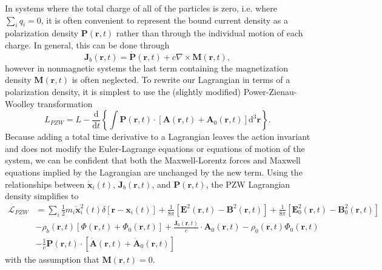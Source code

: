 In systems where the total charge of all of the particles is zero, i.e. where $\sum_iq_i = 0$, it is often convenient to represent the bound current density as a polarization density $\mathbf{P}(\mathbf{r},t)$ rather than through the individual motion of each charge. In general, this can be done through
\begin{equation}
\mathbf{J}_b(\mathbf{r},t) = \dot{\mathbf{P}}(\mathbf{r},t) + c\nabla\times\mathbf{M}(\mathbf{r},t),
\end{equation}
however in nonmagnetic systems the last term containing the magnetization density $\mathbf{M}(\mathbf{r},t)$ is often neglected. To rewrite our Lagrangian in terms of a polarization density, it is simplest to use the (slightly modified) Power-Zienau-Woolley transformation
\begin{equation}
L_{PZW} = L - \frac{\mathrm{d}}{\mathrm{d}t}\left\{\int\mathbf{P}(\mathbf{r},t)\cdot\left[\mathbf{A}(\mathbf{r},t) + \mathbf{A}_0(\mathbf{r},t)\right]\mathrm{d}^3\mathbf{r}\right\}.
\end{equation}
Because adding a total time derivative to a Lagrangian leaves the action invariant and does not modify the Euler-Lagrange equations or equations of motion of the system, we can be confident that both the Maxwell-Lorentz forces and Maxwell equations implied by the Lagrangian are unchanged by the new term. Using the relationships between $\dot{\mathbf{x}}_i(t)$, $\mathbf{J}_b(\mathbf{r},t)$, and $\mathbf{P}(\mathbf{r},t)$, the PZW Lagrangian density simplifies to
\begin{equation}
\begin{split}
\mathcal{L}_{PZW} &= \sum_i\frac{1}{2}m_i\dot{\mathbf{x}}_i^2(t)\delta[\mathbf{r} - \mathbf{x}_i(t)] + \frac{1}{8\pi}\left[\mathbf{E}^2(\mathbf{r},t) - \mathbf{B}^2(\mathbf{r},t)\right] + \frac{1}{8\pi}\left[\mathbf{E}_0^2(\mathbf{r},t) - \mathbf{B}_0^2(\mathbf{r},t)\right]\\
& - \rho_b(\mathbf{r},t)\left[\Phi(\mathbf{r},t) + \Phi_0(\mathbf{r},t)\right] + \frac{\mathbf{J}_0(\mathbf{r},t)}{c}\cdot\mathbf{A}_0(\mathbf{r},t) - \rho_0(\mathbf{r},t)\Phi_0(\mathbf{r},t)\\
& - \frac{1}{c}\mathbf{P}(\mathbf{r},t)\cdot\left[\dot{\mathbf{A}}(\mathbf{r},t) + \dot{\mathbf{A}}_0(\mathbf{r},t)\right]
\end{split}
\end{equation}
with the assumption that $\mathbf{M}(\mathbf{r},t) = 0$.

